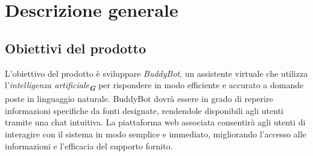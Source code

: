 
\section{Descrizione generale}
\label{sec:descrizione_generale}

\subsection{Obiettivi del prodotto}
L'obiettivo del prodotto è sviluppare \emph{BuddyBot}, un assistente virtuale che utilizza l'\emph{intelligenza artificiale}\textsubscript{\textit{\textbf{G}}} 
per rispondere in modo efficiente e accurato a domande poste in linguaggio naturale. BuddyBot dovrà essere in grado 
di reperire informazioni specifiche da fonti designate, rendendole disponibili agli utenti tramite una chat intuitiva. 
La piattaforma web associata consentirà agli utenti di interagire con il sistema in modo semplice e immediato, migliorando
l'accesso alle informazioni e l'efficacia del supporto fornito.

